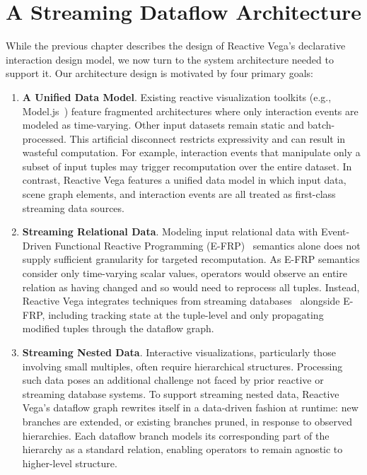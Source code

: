 \graphicspath{{./figures/vega-arch/}}
\chapter{A Streaming Dataflow Architecture}
\label{sec:vg:arch}

While the previous chapter describes the design of Reactive Vega's declarative
interaction design model, we now turn to the system architecture needed to
support it. Our architecture design is motivated by four primary goals:

\begin{enumerate}
  \item \textbf{A Unified Data Model}. Existing reactive visualization
toolkits (e.g., Model.js~\cite{kelleher:modeljs}) feature fragmented
architectures where only interaction events are modeled as time-varying. Other
input datasets remain static and batch-processed. This artificial disconnect
restricts expressivity and can result in wasteful computation. For example,
interaction events that manipulate only a subset of input tuples may trigger
recomputation over the entire dataset. In contrast, Reactive Vega features a
unified data model in which input data, scene graph elements, and interaction
events are all treated as first-class streaming data sources.

  \item \textbf{Streaming Relational Data}. Modeling input relational data with
Event-Driven Functional Reactive Programming (E-FRP)~\cite{wan:efrp} semantics
alone does not supply sufficient granularity for targeted recomputation. As
E-FRP semantics consider only time-varying scalar values, operators would
observe an entire relation as having changed and so would need to reprocess all
tuples. Instead, Reactive Vega integrates techniques from streaming
databases~\cite{abadi:borealis, abadi:aurora, arasu:stream, avnur:eddies,
chandrasekaran:telegraphcq} alongside E-FRP, including tracking state at the
tuple-level and only propagating modified tuples through the dataflow graph.

  \item \textbf{Streaming Nested Data}. Interactive visualizations, particularly
those involving small multiples, often require hierarchical structures.
Processing such data poses an additional challenge not faced by prior reactive
or streaming database systems. To support streaming nested data, Reactive Vega's
dataflow graph rewrites itself in a data-driven fashion at runtime: new branches
are extended, or existing branches pruned, in response to observed hierarchies.
Each dataflow branch models its corresponding part of the hierarchy as a
standard relation, enabling operators to remain agnostic to higher-level
structure.


\end{enumerate}
